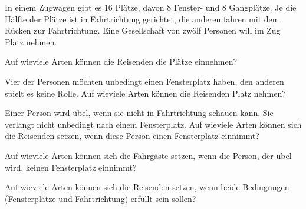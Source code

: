 In einem Zugwagen gibt es 16 Plätze, davon 8 Fenster- und 8 Gangplätze.
Je die Hälfte der Plätze ist in Fahrtrichtung gerichtet, die anderen
fahren mit dem Rücken zur Fahrtrichtung.
Eine Gesellschaft von zwölf Personen will im Zug Platz nehmen.
\begin{teilaufgaben}
\item 
Auf wieviele Arten können die Reisenden die Plätze einnehmen?
\item
Vier der Personen möchten unbedingt einen Fensterplatz haben, den anderen
spielt es keine Rolle.
Auf wieviele Arten können die Reisenden Platz nehmen?
\item
Einer Person wird übel, wenn sie nicht in Fahrtrichtung schauen kann.
Sie verlangt nicht unbedingt nach einem Fensterplatz.
Auf wieviele Arten können sich die Reisenden setzen, wenn diese
Person einen Fensterplatz einnimmt?
\item
Auf wieviele Arten können sich die Fahrgäste setzen, wenn die Person,
der übel wird, keinen Fensterplatz einnimmt?
\item
Auf wieviele Arten können sich die Reisenden setzen, wenn beide Bedingungen
(Fensterplätze und Fahrtrichtung) erfüllt sein sollen?
\end{teilaufgaben}

